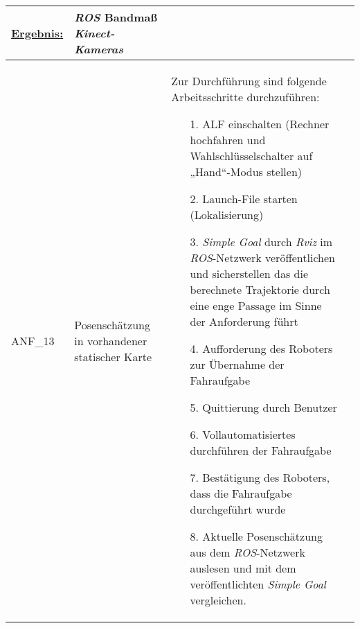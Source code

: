 \documentclass[12pt,a4paper,oneside,numbers=noenddot,captions=tableheading,toc=bibliography,openany,tikz,margin=5mm]{scrbook}
\begin{document}
\begin{longtable}{|p{}|p{}|p{7cm}|p{}|}
	\underline{Ergebnis:}\newline
	\newline
	\textbf{}%
	& \textit{ROS}\newline
	Bandmaß\newline
	\textit{Kinect-Kameras}
	\\
	\hline
	ANF\_13&Posenschätzung in vorhandener statischer Karte & Zur Durchführung sind folgende Arbeitsschritte durchzuführen:
	\begin{itemize}
		\item[1.]	ALF einschalten (Rechner hochfahren und Wahlschlüsselschalter auf „Hand“-Modus stellen)
		\item[2.]	Launch-File starten (Lokalisierung)
		\item[3.]	\textit{Simple Goal} durch \textit{Rviz} im \textit{ROS}-Netzwerk veröffentlichen und sicherstellen das die berechnete Trajektorie durch eine enge Passage im Sinne der Anforderung führt
		\item[4.]	Aufforderung des Roboters zur Übernahme der Fahraufgabe
		\item[5.]	Quittierung durch Benutzer
		\item[6.]	Vollautomatisiertes durchführen der Fahraufgabe
		\item[7.]	Bestätigung des Roboters, dass die Fahraufgabe durchgeführt wurde
		\item[8.]	Aktuelle Posenschätzung aus dem \textit{ROS}-Netzwerk auslesen und mit dem veröffentlichten \textit{Simple Goal} vergleichen.
	\end{itemize}
	

\end{longtable}
\end{document}
